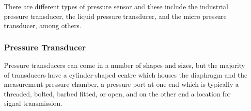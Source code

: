 There are different types of pressure sensor and these include the industrial pressure transducer, the liquid pressure transducer, and the micro pressure transducer, among others. 
\subsubsection{Pressure Transducer}
Pressure transducers can come in a number of shapes and sizes, but the majority of transducers have a cylinder-shaped centre which houses the diaphragm and the measurement pressure chamber, a pressure port at one end which is typically a threaded, bolted, barbed fitted, or open, and on the other end a location for signal transmission\cite{noauthor_different_nodate}. 




